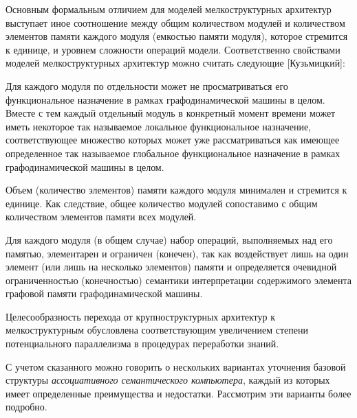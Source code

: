 Основным формальным отличием для моделей мелкоструктурных архитектур выступает иное соотношение между общим количеством модулей и количеством элементов памяти каждого модуля (емкостью памяти модуля), которое стремится к единице, и уровнем сложности операций модели. Соответственно свойствами моделей мелкоструктурных архитектур можно считать следующие [Кузьмицкий]:
\begin{textitemize}
\item Для каждого модуля по отдельности может не просматриваться его функциональное назначение в рамках графодинамической машины в целом. Вместе с тем каждый отдельный модуль в конкретный момент времени может иметь некоторое так называемое локальное функциональное назначение, соответствующее множество которых может уже рассматриваться как имеющее определенное так называемое глобальное функциональное назначение в рамках графодинамической машины в целом.
\item Объем (количество элементов) памяти каждого модуля минимален и стремится к единице. Как следствие, общее количество модулей сопоставимо с общим количеством элементов памяти всех модулей.
\item Для каждого модуля (в общем случае) набор операций, выполняемых над его памятью, элементарен и ограничен (конечен), так как воздействует лишь на один элемент (или лишь на несколько элементов) памяти и определяется очевидной ограниченностью (конечностью) семантики интерпретации содержимого элемента графовой памяти графодинамической машины.
\end{textitemize}

Целесообразность перехода от крупноструктурных архитектур к мелкоструктурным обусловлена  соответствующим увеличением степени потенциального параллелизма в процедурах переработки знаний.

С учетом сказанного можно говорить о нескольких вариантах уточнения базовой структуры \textit{ассоциативного семантического компьютера}, каждый из которых имеет определенные  преимущества и недостатки. Рассмотрим эти варианты более подробно.


